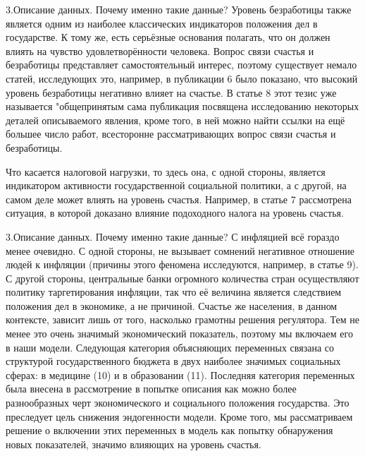 \documentclass[aspectratio=169]{beamer}
\begin{document}
\begin{frame}{3.Описание данных. Почему именно такие данные?}
Уровень безработицы также является одним из наиболее классических индикаторов положения дел в государстве. К тому же, есть серьёзные основания полагать, что он должен влиять на чувство удовлетворённости человека. Вопрос связи счастья и безработицы представляет самостоятельный интерес, поэтому существует немало статей, исследующих это, например, в публикации 6 было показано, что высокий уровень безработицы негативно влияет на счастье. В статье 8 этот тезис уже называется "общепринятым сама публикация посвящена исследованию некоторых деталей описываемого явления, кроме того, в ней можно найти ссылки на ещё большее число работ, всесторонне рассматривающих вопрос связи счастья и безработицы.
\hfill \break
\hfill \break

Что касается налоговой нагрузки, то здесь она, с одной стороны, является индикатором активности государственной социальной политики, а с другой, на самом деле может влиять на уровень счастья. Например, в статье 7 рассмотрена ситуация, в которой доказано влияние подоходного налога на уровень счастья.
\end{frame}

\begin{frame}{3.Описание данных. Почему именно такие данные?}
\small
С инфляцией всё гораздо менее очевидно. С одной стороны, не вызывает сомнений негативное отношение людей к инфляции (причины этого феномена исследуются, например, в статье 9). С другой стороны, центральные банки огромного количества стран осуществляют политику таргетирования инфляции, так что её величина является следствием положения дел в экономике, а не причиной. Счастье же населения, в данном контексте, зависит лишь от того, насколько грамотны решения регулятора. Тем не менее это очень значимый экономический показатель, поэтому мы включаем его в наши модели. Следующая категория объясняющих переменных связана со структурой государственного бюджета в двух наиболее значимых социальных сферах: в медицине (10) и в образовании (11).
\hfill \break
\hfill \break
Последняя категория переменных была внесена в рассмотрение в попытке описания как можно более разнообразных черт экономического и социального положения государства. Это преследует цель снижения эндогенности модели. Кроме того, мы рассматриваем решение о включении этих переменных в модель как попытку обнаружения новых показателей, значимо влияющих на уровень счастья.
\end{frame}
\end{document}
